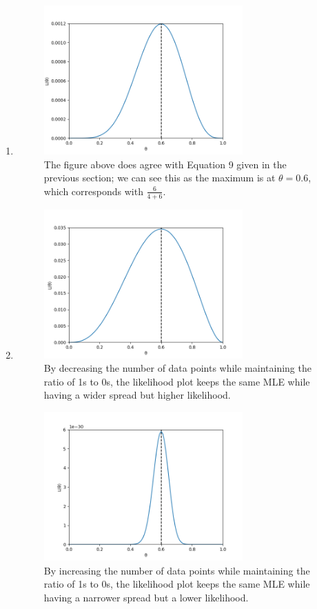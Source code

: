 \documentclass[11pt]{article}
\newcommand{\solution}[1]{{{\color{blue}{\bf Solution:} {#1}}}}
\begin{document}
\begin{enumerate}
\item
\solution{
\begin{figure}[!htbp]
    \centering
    \includegraphics[width=3in]{1c.png}
    \caption{The figure above does agree with Equation 9 given in the previous section; we can see this as the maximum is at $\theta = 0.6$, which corresponds with $\frac{6}{4 + 6}$.}
\end{figure}
}

\item
\solution{
\begin{figure}[!htbp]
    \centering
    \includegraphics[width=3in]{1di.png}
    \caption{By decreasing the number of data points while maintaining the ratio of 1s to 0s, the likelihood plot keeps the same MLE while having a wider spread but higher likelihood.}
\end{figure}
\newpage

\begin{figure}[!htbp]
    \centering
    \includegraphics[width=3in]{1dii.png}
    \caption{By increasing the number of data points while maintaining the ratio of 1s to 0s, the likelihood plot keeps the same MLE while having a narrower spread but a lower likelihood.}
\end{figure}

}
\end{enumerate}
\end{document}
